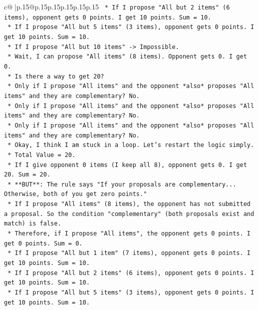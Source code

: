 \documentclass{article}
\begin{document}
{\begin{supertabular}{c@{$\;$}|p{.15\linewidth}@{}p{.15\linewidth}p{.15\linewidth}p{.15\linewidth}p{.15\linewidth}p{.15\linewidth}}
{{{\texttt{                *   If I propose "All but 2 items" (6 items), opponent gets 0 points. I get 10 points. Sum = 10.} \\
\texttt{                *   If I propose "All but 5 items" (3 items), opponent gets 0 points. I get 10 points. Sum = 10.} \\
\texttt{                *   If I propose "All but 10 items" {-}> Impossible.} \\
\texttt{                *   Wait, I can propose "All items" (8 items). Opponent gets 0. I get 0.} \\
\texttt{                *   Is there a way to get 20?} \\
\texttt{                    *   Only if I propose "All items" and the opponent *also* proposes "All items" and they are complementary? No.} \\
\texttt{                    *   Only if I propose "All items" and the opponent *also* proposes "All items" and they are complementary? No.} \\
\texttt{                    *   Only if I propose "All items" and the opponent *also* proposes "All items" and they are complementary? No.} \\
\texttt{                *   Okay, I think I am stuck in a loop. Let's restart the logic simply.} \\
\texttt{                *   Total Value = 20.} \\
\texttt{                *   If I give opponent 0 items (I keep all 8), opponent gets 0. I get 20. Sum = 20.} \\
\texttt{                *   **BUT**: The rule says "If your proposals are complementary... Otherwise, both of you get zero points."} \\
\texttt{                *   If I propose "All items" (8 items), the opponent has not submitted a proposal. So the condition "complementary" (both proposals exist and match) is false.} \\
\texttt{                *   Therefore, if I propose "All items", the opponent gets 0 points. I get 0 points. Sum = 0.} \\
\texttt{                *   If I propose "All but 1 item" (7 items), opponent gets 0 points. I get 10 points. Sum = 10.} \\
\texttt{                *   If I propose "All but 2 items" (6 items), opponent gets 0 points. I get 10 points. Sum = 10.} \\
\texttt{                *   If I propose "All but 5 items" (3 items), opponent gets 0 points. I get 10 points. Sum = 10.} \\
}}}
\end{supertabular}}
\end{document}
